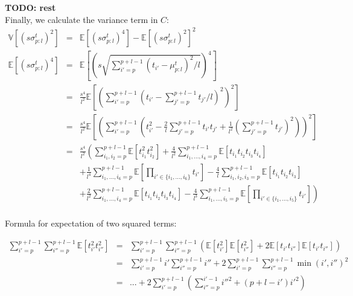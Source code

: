 \documentclass[12pt,a4paper]{article}
\newcommand{\subsmean}[2]{\mu^t_{#1:#2}} %
\newcommand{\subsvar}[2]{\sigma^t_{#1:#2}} %
\newcommand{\expectation}[1]{\mathbb{E}\left[#1\right]} %
\newcommand{\variance}[1]{\mathbb{V}\left[#1\right]} %
\newcommand{\subsmeanpl}{\subsmean{p}{l}} %
\newcommand{\subsvarpl}{\subsvar{p}{l}} %
\begin{document}
\textbf{TODO: rest}
\\

Finally, we calculate the variance term in $C$:
$$\begin{array}{rcl}
    \variance{\left(s\subsvarpl\right)^2} & = & \expectation{\left(s\subsvarpl\right)^4} - \expectation{\left(s\subsvarpl\right)^2}^2 \\[8pt]
    \expectation{\left(s\subsvarpl\right)^4} & = & \expectation{\left(s\sqrt{\sum_{i'=p}^{p+l-1}\left(t_{i'}-\subsmeanpl\right)^2/l}\right)^4} \\[16pt]
    & = & \frac{s^4}{l^2}\expectation{\left(\sum_{i'=p}^{p+l-1}\left(t_{i'}-\sum_{j'=p}^{p+l-1}t_{j'}/l\right)^2\right)^2} \\[16pt]
    & = & \frac{s^4}{l^2}\expectation{\left(\sum_{i'=p}^{p+l-1}\left(t_{i'}^2 - \frac{2}{l}\sum_{j'=p}^{p+l-1}t_{i'}t_{j'} + \frac{1}{l^2}\left(\sum_{j'=p}^{p+l-1}t_{j'}\right)^2\right)\right)^2} \\[16pt]
    & = & \frac{s^4}{l^2}\left(\sum_{i_1,i_2=p}^{p+l-1}\expectation{t_{i_1}^2t_{i_2}^2} + \frac{4}{l^2}\sum_{i_1,...,i_4=p}^{p+l-1}\expectation{t_{i_1}t_{i_2}t_{i_3}t_{i_4}} \right. \\[8pt]
    && + \frac{1}{l^4}\sum_{i_1,...,i_6=p}^{p+l-1}\expectation{\prod_{i'\in\{i_1,...,i_6\}}t_{i'}} - \frac{4}{l}\sum_{i_1,i_2,i_3=p}^{p+l-1}\expectation{t_{i_1}t_{i_2}t_{i_3}} \\[8pt]
    && + \left. \frac{2}{l^2}\sum_{i_1,...,i_4=p}^{p+l-1}\expectation{t_{i_1}t_{i_2}t_{i_3}t_{i_4}} - \frac{4}{l^3}\sum_{i_1,...,i_5=p}^{p+l-1}\expectation{\prod_{i'\in\{i_1,...,i_5\}}t_{i'}} \right) \\[8pt]
\end{array}$$

Formula for expectation of two squared terms:

$$
\begin{array}{rcl}
    \sum_{i'=p}^{p+l-1}\sum_{i''=p}^{p+l-1}\expectation{t_{i'}^2t_{i''}^2} & = & \sum_{i'=p}^{p+l-1}\sum_{i''=p}^{p+l-1}\left(\expectation{t_{i'}^2}\expectation{t_{i''}^2} + 2\expectation{t_{i'}t_{i''}}\expectation{t_{i'}t_{i''}} \right) \\[8pt]
    & = & \sum_{i'=p}^{p+l-1}i'\sum_{i''=p}^{p+l-1}i'' + 2\sum_{i'=p}^{p+l-1}\sum_{i''=p}^{p+l-1}\min(i',i'')^2 \\[8pt]
    & = & ... + 2\sum_{i'=p}^{p+l-1}\left(\sum_{i''=p}^{i'-1}i''^2 + (p+l-i')i'^2\right) \\[8pt]
\end{array}
$$
\end{document}
